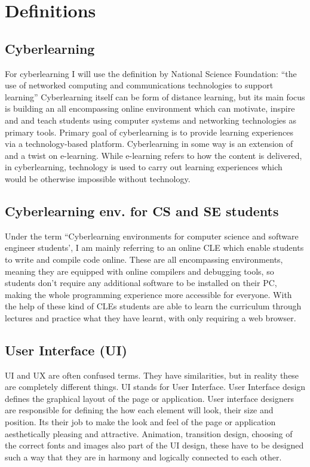 \documentclass[10pt,twoside,english,a4paper]{article}
\begin{document}
\section{Definitions}\label{definitions}

\subsection{Cyberlearning}
For cyberlearning I will use the definition by National Science Foundation: 
``the use of networked computing and communications technologies to support learning” \cite{borgman_2017_fostering} 
Cyberlearning itself can be form of distance learning, but its main focus is building an all 
encompassing online environment which can motivate, inspire and and teach students using 
computer systems and networking technologies as primary tools. \cite{ui/ux}
Primary goal of cyberlearning is to provide learning experiences via a technology-based platform. 
Cyberlearning in some way is an extension of and a twist on e-learning.\cite{lynch_2020_cyberlearning}
While e-learning refers to how the content is delivered, in cyberlearning, technology
is used to carry out learning experiences which would be otherwise impossible without technology.\cite{lynch_2020_cyberlearning}

\subsection{Cyberlearning env. for CS and SE students}
Under the term ``Cyberlearning environments for computer science and software engineer students', I am mainly
referring to an online CLE which enable students to write and compile code online. These are all encompassing
environments, meaning they are equipped with 
online compilers and debugging tools, so students don't require any additional software to be installed on their PC, making
the whole programming experience more accessible for everyone.
With the help of these kind of CLEs students are able to learn the curriculum through lectures and practice
what they have learnt, with only requiring a web browser.

\subsection{User Interface (UI)}
UI and UX are often confused terms. \cite{theymakedesign_2019_what} They have similarities, but in reality
these are completely different things.
UI stands for User Interface. User Interface design defines the graphical layout of the page or application.
User interface designers are responsible for defining the how each element will look, their size and position.
Its their job to make the look and feel of the page or application aesthetically pleasing and 
attractive. Animation, transition design, choosing of the correct fonts and images also part of the UI design, 
these have to be designed such a way that they are in harmony and logically connected to each other.
\cite{theymakedesign_2019_what}
\end{document}
